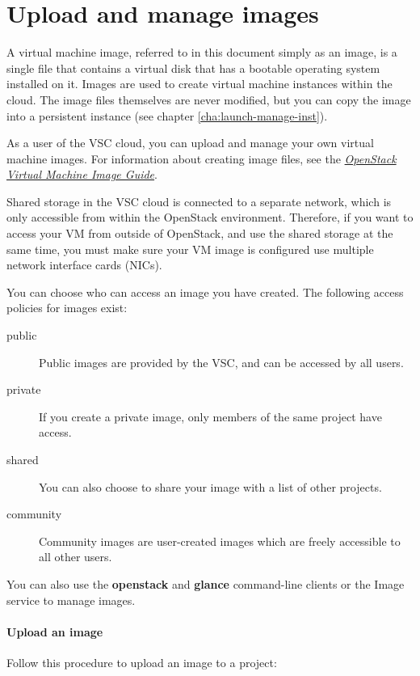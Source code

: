 \chapter{Upload and manage images}\label{cha:upload-manage-images}
A virtual machine image, referred to in this document simply as an
image, is a single file that contains a virtual disk that has a
bootable operating system installed on it. Images are used to create
virtual machine instances within the cloud.  The image files
themselves are never modified, but you can copy the image into a persistent instance (see chapter \ref{cha:launch-manage-inst}).

As a user of the VSC cloud, you can upload and manage your own virtual
machine images.  For information about creating image files, see the
\href{https://docs.openstack.org/image-guide/}{\emph{OpenStack Virtual
    Machine Image Guide}}.

 Shared storage in the VSC cloud is connected to a separate network, which is only accessible from within the OpenStack environment.  Therefore, if you want to access your VM from outside of OpenStack, and use the shared storage at the same time, you must make sure your VM image is configured use multiple network interface cards (NICs).

You can choose who can access an image you have created.  The following access policies for images exist:
\begin{description}
\item[public] Public images are provided by the VSC, and can be accessed by all users.
\item[private] If you create a private image, only members of the same
  project have access.
\item[shared] You can also choose to share your image with a list of
  other projects.
\item[community] Community images are user-created images which are
  freely accessible to all other users.
\end{description}

 You can also use the \textbf{openstack} and
\textbf{glance} command-line clients or the Image service to manage
images.

\subsubsection{Upload an image}
Follow this procedure to upload an image to a project:

